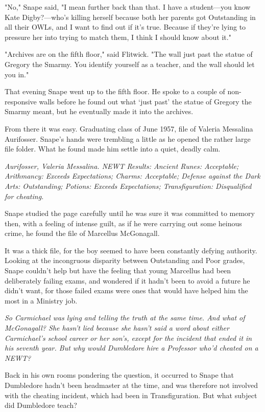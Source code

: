 "No," Snape said, "I mean further back than that. I have a student—you know Kate Digby?—who's killing herself because both her parents got Outstanding in all their OWLs, and I want to find out if it's true. Because if they're lying to pressure her into trying to match them, I think I should know about it."

"Archives are on the fifth floor," said Flitwick. "The wall just past the statue of Gregory the Smarmy. You identify yourself as a teacher, and the wall should let you in."

That evening Snape went up to the fifth floor. He spoke to a couple of non-responsive walls before he found out what `just past' the statue of Gregory the Smarmy meant, but he eventually made it into the archives.

From there it was easy. Graduating class of June 1957, file of Valeria Messalina Aurifosser. Snape's hands were trembling a little as he opened the rather large file folder. What he found made him settle into a quiet, deadly calm.

\emph{Aurifosser, Valeria Messalina. NEWT Results: Ancient Runes: Acceptable; Arithmancy: Exceeds Expectations; Charms: Acceptable; Defense against the Dark Arts: Outstanding; Potions: Exceeds Expectations; Transfiguration: Disqualified for cheating.}

Snape studied the page carefully until he was sure it was committed to memory then, with a feeling of intense guilt, as if he were carrying out some heinous crime, he found the file of Marcellus McGonagall.

It was a thick file, for the boy seemed to have been constantly defying authority. Looking at the incongruous disparity between Outstanding and Poor grades, Snape couldn't help but have the feeling that young Marcellus had been deliberately failing exams, and wondered if it hadn't been to avoid a future he didn't want, for those failed exams were ones that would have helped him the most in a Ministry job.

\emph{So Carmichael was lying and telling the truth at the same time. And what of McGonagall? She hasn't lied because she hasn't said a word about either Carmichael's school career or her son's, except for the incident that ended it in his seventh year. But why would Dumbledore hire a Professor who'd cheated on a NEWT?}

Back in his own rooms pondering the question, it occurred to Snape that Dumbledore hadn't been headmaster at the time, and was therefore not involved with the cheating incident, which had been in Transfiguration. But what subject did Dumbledore teach?

